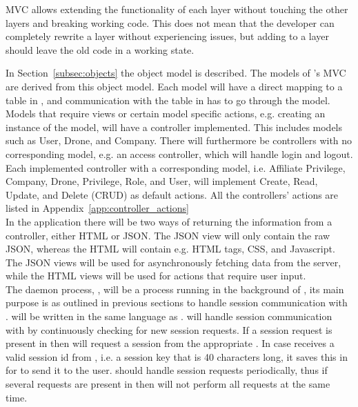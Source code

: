 
MVC allows extending the functionality of each layer without touching the other layers and breaking working code.
This does not mean that the developer can completely rewrite a layer without experiencing issues, but adding to a layer should leave the old code in a working state.

In Section~\ref{subsec:objects} the object model is described.
The models of 's MVC are derived from this object model.
Each model will have a direct mapping to a table in , and communication with the table in  has to go through the model. \\

Models that require views or certain model specific actions, e.g. creating an instance of the model, will have a controller implemented.
This includes models such as User, Drone, and Company.
There will furthermore be controllers with no corresponding model, e.g. an access controller, which will handle login and logout.
Each implemented controller with a corresponding model, i.e. Affiliate Privilege, Company, Drone, Privilege, Role, and User, will implement Create, Read, Update, and Delete (CRUD) as default actions. All the controllers' actions are listed in Appendix~\ref{app:controller_actions} \\

In the application there will be two ways of returning the information from a controller, either HTML or JSON.
The JSON view will only contain the raw JSON, whereas the HTML will contain e.g. HTML tags, CSS, and Javascript.
The JSON views will be used for asynchronously fetching data from the server, while the HTML views will be used for actions that require user input. \\

The daemon process, , will be a process running in the background of , its main purpose is as outlined in previous sections to handle session communication with .
 will be written in the same language as . %
 will handle session communication with  by continuously checking  for new session requests.
If a session request is present in  then  will request a session from the appropriate .
In case  receives a valid session id from , i.e. a session key that is 40 characters long, it saves this in  for  to send it to the user.
 should handle session requests periodically, thus if several requests are present in  then  will not perform all requests at the same time. \\

